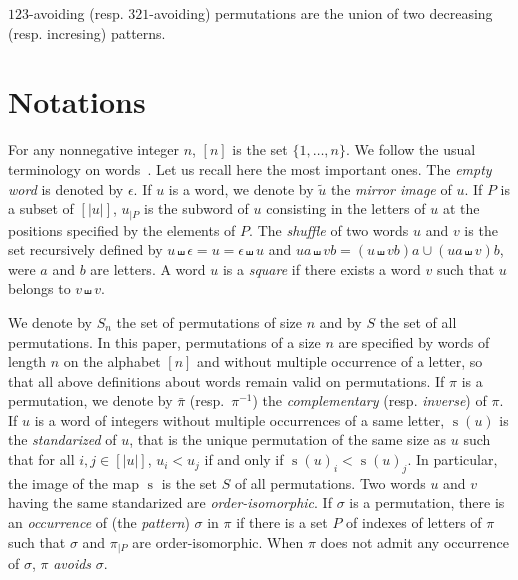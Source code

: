 \documentclass[a4paper]{llncs}
\DeclareMathOperator{\STD}{\mathrm{s}}
\begin{document}
$123$-avoiding (resp. $321$-avoiding) permutations are the union of two decreasing
(resp. incresing) patterns.


\section{Notations}
\label{section:Notations}

For any nonnegative integer $n$, $[n]$ is the set $\{1, \dots, n\}$.
We follow the usual terminology on words~\cite{ChoffrutKarhumaki1997}.
Let us recall here the most important ones. The {\em empty word} is
denoted by $\epsilon$. If $u$ is a word, we denote by $\widetilde{u}$
the {\em mirror image} of $u$. If $P$ is a subset of $[|u|]$, $u_{|P}$
is the subword of $u$ consisting in the letters of $u$ at the positions
specified by the elements of $P$. The {\em shuffle} of two words $u$ and
$v$ is the set recursively defined by
$u \shuffle \epsilon = u = \epsilon \shuffle u$ and
$ua \shuffle vb = (u \shuffle vb)a \cup (ua \shuffle v)b$, were $a$ and
$b$ are letters. A word $u$ is a {\em square} if there exists a word $v$
such that $u$ belongs to $v \shuffle v$.

We denote by $S_n$ the set of permutations of size $n$ and by $S$ the
set of all permutations. In this paper, permutations of a size $n$
are specified by words of length $n$ on the alphabet $[n]$ and without
multiple occurrence of a letter, so that all above definitions about
words remain valid on permutations. If $\pi$ is a permutation, we denote
by $\bar \pi$ (resp.~$\pi^{-1}$) the {\em complementary} (resp.
{\em inverse}) of $\pi$. If $u$ is a word of integers without multiple
occurrences of a same letter, $\STD(u)$ is the {\em standarized} of $u$,
that is the unique permutation of the same size as $u$ such that for all
$i, j \in [|u|]$, $u_i < u_j$ if and only if $\STD(u)_i < \STD(u)_j$. In
particular, the image of the map $\STD$ is the set $S$ of all
permutations. Two words $u$ and $v$ having the same standarized are
{\em order-isomorphic}. If $\sigma$ is a permutation, there is an
{\em occurrence} of (the {\em pattern}) $\sigma$ in $\pi$ if there is a
set $P$ of indexes of letters of $\pi$ such that $\sigma$ and $\pi_{|P}$
are order-isomorphic. When $\pi$ does not admit any occurrence of
$\sigma$, $\pi$ {\em avoids} $\sigma$.
\end{document}
